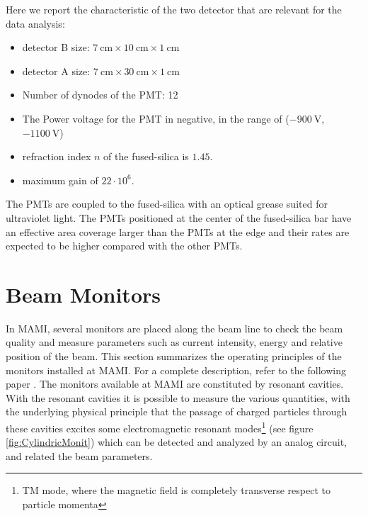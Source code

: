 Here we report the characteristic of the two detector that are relevant for the data analysis: 

\begin{itemize}
\item detector B size: $\SI{7}{\centi \meter} \times \SI{10}{\centi \meter} \times \SI{1}{\centi \meter}$
\item detector A size: $\SI{7}{\centi \meter} \times \SI{30}{\centi \meter} \times \SI{1}{\centi \meter}$
\item Number of dynodes of the PMT: 12
\item The Power voltage for the PMT in negative, in the range of ($\SI{-900}{\volt}$, $\SI{-1100}{\volt}$)
\item refraction index $n$ of the fused-silica is $1.45$.
\item maximum gain of $22 \cdot 10^{6}$.
\end{itemize}

The PMTs are coupled to the fused-silica with an optical grease suited for ultraviolet light. The PMTs positioned at the center of the fused-silica bar have an effective area coverage larger than the PMTs at the edge and their rates are expected to be higher compared with the other PMTs. 

\section{Beam Monitors}

In MAMI, several monitors are placed along the beam line to check the beam quality and measure parameters such as current intensity, energy and relative position of the beam. This section summarizes the operating principles of the monitors installed at MAMI. For a complete description, refer to the following paper \cite{M_Dehn} .
The monitors available at MAMI are constituted by resonant cavities. With the resonant cavities it is possible to measure the various quantities, with the underlying physical principle that the passage of charged particles through these cavities excites some electromagnetic resonant modes\footnote{TM mode, where the magnetic field is completely transverse respect to particle momenta} (see figure \ref{fig:CylindricMonit}) which can be detected and analyzed by an analog circuit, and related the beam parameters.

